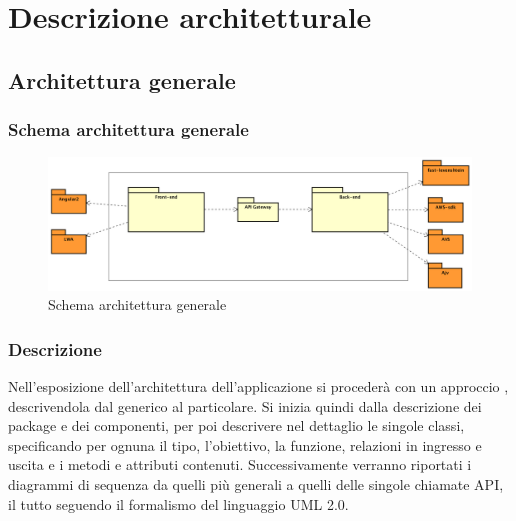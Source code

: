 \documentclass[../DefinizioneDiProdotto_v2.0.0.tex]{subfiles}
\begin{document}
\section{Descrizione architetturale}

\subsection{Architettura generale}
\subsubsection{Schema architettura generale}
\begin{figure}[!h]
	\centering
	\includegraphics[width=\textwidth]{Architettura/AltoLivello.png}
	\caption{Schema architettura generale}
\end{figure}

\subsubsection{Descrizione}
Nell'esposizione dell'architettura dell'applicazione si procederà con un approccio , descrivendola dal generico al particolare. Si inizia quindi dalla descrizione dei package e dei componenti, per poi descrivere nel dettaglio le singole classi, specificando per ognuna il tipo, l'obiettivo, la funzione, relazioni in ingresso e uscita e i metodi e attributi contenuti. Successivamente verranno riportati i diagrammi di sequenza da quelli più generali a quelli delle singole chiamate API, il tutto seguendo il formalismo del linguaggio UML 2.0.
\end{document}
